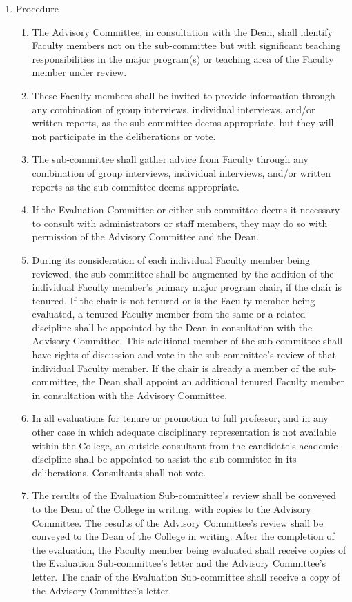 \documentclass{manual}
\newcommand{\itemLevelA}{\alph*.}
\newcommand{\itemLevelB}{\arabic*)}
\newcommand{\itemRefA}{\alph*}
\newcommand{\itemRefB}{\arabic*}
\begin{document}
\begin{enumerate}[label=\itemLevelA,ref=\itemRefA]
				\item Procedure \label{item:procedure08}

					\begin{enumerate}[label=\itemLevelB,ref=\itemRefB]
					\item The Advisory Committee, in consultation with the Dean, shall identify Faculty members not on the sub-committee but with significant teaching responsibilities in the major program(s) or teaching area of the Faculty member under review.
					\item These Faculty members shall be invited to provide information through any combination of group interviews, individual interviews, and/or written reports, as the sub-committee deems appropriate, but they will not participate in the deliberations or vote.
					\item The sub-committee shall gather advice from Faculty through any combination of group interviews, individual interviews, and/or written reports as the sub-committee deems appropriate.
					\item If the Evaluation Committee or either sub-committee deems it necessary to consult with administrators or staff members, they may do so with permission of the Advisory Committee and the Dean.
					\item During its consideration of each individual Faculty member being reviewed, the sub-committee shall be augmented by the addition of the individual Faculty member's primary major program chair, if the chair is tenured. If the chair is not tenured or is the Faculty member being evaluated, a tenured Faculty member from the same or a related discipline shall be appointed by the Dean in consultation with the Advisory Committee. This additional member of the sub-committee shall have rights of discussion and vote in the sub-committee's review of that individual Faculty member. If the chair is already a member of the sub-committee, the Dean shall appoint an additional tenured Faculty member in consultation with the Advisory Committee.
					\item In all evaluations for tenure or promotion to full professor, and in any other case in which adequate disciplinary representation is not available within the College, an outside consultant from the candidate's academic discipline shall be appointed to assist the sub-committee in its deliberations. Consultants shall not vote.
					\item \label{item:results09} The results of the Evaluation Sub-committee's review shall be conveyed to the Dean of the College in writing, with copies to the Advisory Committee. The results of the Advisory Committee's review shall be conveyed to the Dean of the College in writing. After the completion of the evaluation, the Faculty member being evaluated shall receive copies of the Evaluation Sub-committee's letter and the Advisory Committee's letter. The chair of the Evaluation Sub-committee shall receive a copy of the Advisory Committee's letter.
					\end{enumerate}
				
				\end{enumerate}
\end{document}
